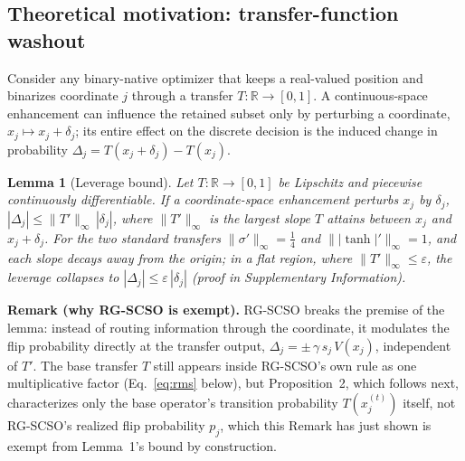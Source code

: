 \documentclass[preprint,3p,times]{elsarticle}
\newtheorem{lemma}{Lemma}
\begin{document}
\subsection{Theoretical motivation: transfer-function washout}
\label{sec:washout}
Consider any binary-native optimizer that keeps a real-valued position and
binarizes coordinate $j$ through a transfer $T:\mathbb{R}\to[0,1]$. A
continuous-space enhancement can influence the retained subset only by
perturbing a coordinate, $x_j\mapsto x_j+\delta_j$; its entire effect on the
discrete decision is the induced change in probability
$\Delta_j=T(x_j+\delta_j)-T(x_j)$.

\begin{lemma}[Leverage bound]
Let $T:\mathbb{R}\to[0,1]$ be Lipschitz and piecewise continuously
differentiable. If a coordinate-space enhancement perturbs $x_j$ by $\delta_j$,
$|\Delta_j|\le\|T'\|_\infty\,|\delta_j|$, where $\|T'\|_\infty$ is the largest
slope $T$ attains between $x_j$ and $x_j+\delta_j$. For the two standard
transfers $\|\sigma'\|_\infty=\tfrac14$ and $\||\tanh|'\|_\infty=1$, and each
slope decays away from the origin; in a flat region, where
$\|T'\|_\infty\le\varepsilon$, the leverage collapses to
$|\Delta_j|\le\varepsilon\,|\delta_j|$ (proof in Supplementary Information).
\end{lemma}
\noindent\textbf{Remark (why RG-SCSO is exempt).} RG-SCSO breaks the premise
of the lemma: instead of routing information through the coordinate, it
modulates the flip probability directly at the transfer output,
$\Delta_j=\pm\,\gamma\,s_j\,V(x_j)$, independent of $T'$. The base transfer
$T$ still appears inside RG-SCSO's own rule as one multiplicative factor
(Eq.~\ref{eq:rms} below), but Proposition~2, which follows next,
characterizes only the base operator's transition probability
$T(x_j^{(t)})$ itself, not RG-SCSO's realized flip probability $p_j$, which
this Remark has just shown is exempt from Lemma~1's bound by construction.
\end{document}
